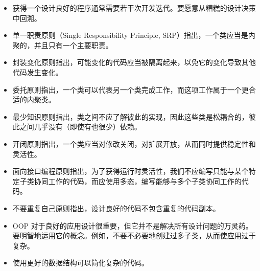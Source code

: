 \begin{itemize}
\item 获得一个设计良好的程序通常需要若干次开发迭代。要愿意从糟糕的设计决策中回溯。
\item 单一职责原则（Single Responsibility Principle, SRP）指出，一个类应当是内聚的，并且只有一个主要职责。
\item 封装变化原则指出，可能变化的代码应当被隔离起来，以免它的变化导致其他代码发生变化。
\item 委托原则指出，一个类可以代表另一个类完成工作，而这项工作属于一个更合适的内聚类。
\item 最少知识原则指出，类之间不应了解彼此的实现，因此这些类是松耦合的，彼此之间几乎没有（即使有也很少）依赖。
\item 开闭原则指出，一个类应当对修改关闭，对扩展开放，从而同时提供稳定性和灵活性。
\item 面向接口编程原则指出，为了获得运行时灵活性，我们不应编写只能与某个特定子类协同工作的代码，而应使用多态，编写能够与多个子类协同工作的代码。
\item 不要重复自己原则指出，设计良好的代码不包含重复的代码副本。
\item OOP 对于良好的应用设计很重要，但它并不是解决所有设计问题的万灵药。要明智地运用它的概念。例如，不要不必要地创建过多子类，从而使应用过于复杂。
\item 使用更好的数据结构可以简化复杂的代码。
\end{itemize}
